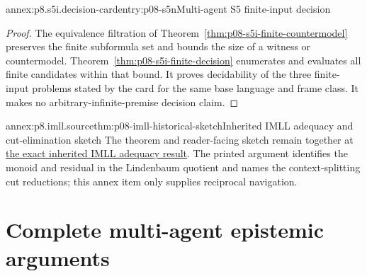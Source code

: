 \begin{annexitem}{annex:p8.s5i.decision-card}{entry:p08-s5n}{Multi-agent S5 finite-input decision}
\begin{proof}
The equivalence filtration of
Theorem~\ref{thm:p08-s5i-finite-countermodel} preserves the finite
subformula set and bounds the size of a witness or countermodel.
Theorem~\ref{thm:p08-s5i-finite-decision} enumerates and evaluates all
finite candidates within that bound. It proves decidability of the three
finite-input problems stated by the card for the same base language and
frame class. It makes no arbitrary-infinite-premise decision claim.
\end{proof}
\end{annexitem}

\begin{annexitem}{annex:p8.imll.source}{thm:p08-imll-historical-sketch}{Inherited IMLL adequacy and cut-elimination sketch}
The theorem and reader-facing sketch remain together at
\hyperref[thm:p08-source-imll-adequacy]{the exact inherited IMLL adequacy
result}.  The printed argument identifies the monoid and residual in the
Lindenbaum quotient and names the context-splitting cut reductions; this annex
item only supplies reciprocal navigation.
\end{annexitem}


\section{Complete multi-agent epistemic arguments}
\label{sec:p08-s5i-completion-annex}

